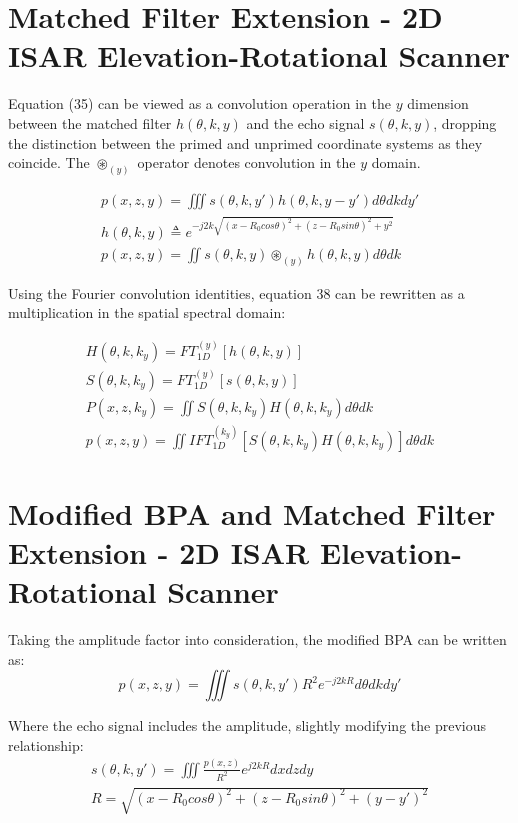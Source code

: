 \documentclass[conference]{IEEEtran}
\begin{document}
\section{Matched Filter Extension - 2D ISAR Elevation-Rotational Scanner}
Equation (35) can be viewed as a convolution operation in the $y$ dimension between the matched filter $h(\theta,k,y)$ and the echo signal $s(\theta,k,y)$, dropping the distinction between the primed and unprimed coordinate systems as they coincide. The $\circledast_{(y)}$ operator denotes convolution in the $y$ domain.

\begin{gather}
	p(x,z,y) = \iiint s(\theta,k,y') h(\theta,k,y-y') d\theta dk dy' \\
	h(\theta,k,y) \triangleq e^{-j2k\sqrt{(x - R_0cos\theta)^2 + (z - R_0sin\theta)^2 + y^2}} \\
	p(x,z,y) = \iint s(\theta,k,y) \circledast_{(y)} h(\theta,k,y) d\theta dk
\end{gather}

Using the Fourier convolution identities, equation 38 can be rewritten as a multiplication in the spatial spectral domain:

\begin{gather}
	H(\theta,k,k_y) = FT_{1D}^{(y)} [ h(\theta,k,y) ]\\
	S(\theta,k,k_y) = FT_{1D}^{(y)} [ s(\theta,k,y) ]\\
	P(x,z,k_y) = \iint S(\theta,k,k_y) H(\theta,k,k_y) d\theta dk \\
	p(x,z,y) = \iint IFT_{1D}^{(k_y)}\left[S(\theta,k,k_y) H(\theta,k,k_y)\right] d\theta dk
\end{gather}

\section{Modified BPA and Matched Filter Extension - 2D ISAR Elevation-Rotational Scanner}
Taking the amplitude factor into consideration, the modified BPA can be written as:
\begin{equation}
	p(x,z,y) = \iiint s(\theta,k,y') R^2 e^{-j2kR} d\theta dk dy'
\end{equation}

Where the echo signal includes the amplitude, slightly modifying the previous relationship:
\begin{gather}
s(\theta,k,y') = \iiint \frac{p(x,z)}{R^2}e^{j2kR} dxdzdy \\
R = \sqrt{(x - R_0cos\theta)^2 + (z - R_0sin\theta)^2 + (y - y')^2}
\end{gather}
\end{document}
